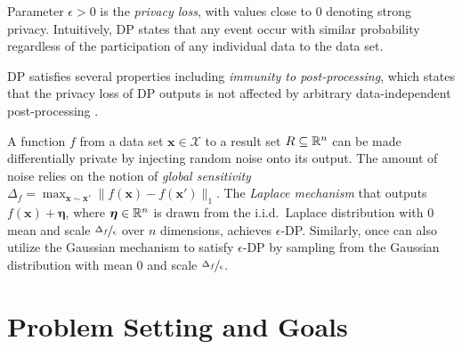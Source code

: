 \documentclass[9pt,lineno,twocolumn,twoside]{pnas-new}
\newcommand{\cX}{\mathcal{X}}
\begin{document}
    \noindent
    Parameter $\epsilon \!>\! 0$ is the \emph{privacy loss}, with values close
    to $0$ denoting strong privacy. Intuitively, DP states that
    any event occur with similar probability regardless of the participation
    of any individual data to the data set.

    DP satisfies several properties including
    \emph{immunity to post-processing}, which states that the privacy
    loss of DP outputs is not affected by arbitrary data-independent
    post-processing \cite{Dwork:13}.

    A function $f$ from a data set $\bm{x} \in \cX$ to a result set
    $R \subseteq \mathbb{R}^n$ can be made differentially private by injecting
    random noise onto its output. The amount of noise relies on the notion
    of \emph{global sensitivity} %
    \(
    \Delta_f = \max_{\bm{x} \sim \bm{x}'} \| f(\bm{x}) - f(\bm{x}') \|_1.
    \)
    The \emph{Laplace mechanism} \cite{Dwork:06} that outputs $f(\bm{x}) + \bm{\eta}$, where $\bm{\eta} \in \mathbb{R}^n$ is drawn from the i.i.d.~Laplace distribution with $0$ mean and scale  $\nicefrac{\Delta_f}{\epsilon}$ over $n$ dimensions, achieves $\epsilon$-DP. Similarly, once can also utilize the Gaussian mechanism to satisfy $\epsilon$-DP by sampling from the Gaussian distribution with mean 0 and scale $\nicefrac{\Delta_f}{\epsilon}$.

    \section*{Problem Setting and Goals}
    \label{sec:setting}
\end{document}
